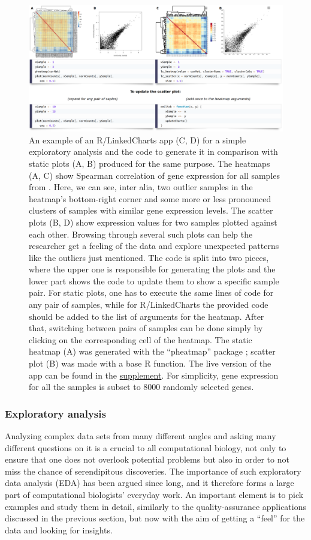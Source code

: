 \documentclass[twocolumn,10pt]{article}
\newcommand{\supplement}{\href{https://anders-biostat.github.io/lc-paper/}{supplement}}
\begin{document}
\begin{figure}[t]
	\includegraphics[width=\textwidth]{FigE/figE.png}
	\caption{An example of an R/LinkedCharts app (C, D) for a simple exploratory analysis and the code to generate it in comparison with static plots (A, B) produced for the same purpose. The heatmaps (A, C) show Spearman correlation of gene expression for all samples from \citet{conway_2015}. Here, we can see, inter alia, two outlier samples in the heatmap's bottom-right corner and some more or less pronounced clusters of samples with similar gene expression levels. The scatter plots (B, D) show expression values for two samples plotted against each other. Browsing through several such plots can help the researcher get a feeling of the data and explore unexpected patterns like the outliers just mentioned. The code is split into two pieces, where the upper one is responsible for generating the plots and the lower part shows the code to update them to show a specific sample pair. For static plots, one has to execute the same lines of code for any pair of samples, while for R/LinkedCharts the provided code should be added to the list of arguments for the heatmap. After that, switching between pairs of samples can be done simply by clicking on the corresponding cell of the heatmap. The static heatmap (A) was generated with the ``pheatmap'' package  \citep{kolde_2019}; scatter plot (B) was made with a base R function. The live version of the app can be found in the \supplement. For simplicity, gene expression for all the samples is subset to 8000 randomly selected genes.}
	\label{FigE}
\end{figure}

\subsubsection{Exploratory analysis}

Analyzing complex data sets from many different angles and asking many different questions on it is a crucial to all computational biology, not only to ensure that one does not overlook potential problems but also in order to not miss the chance of serendipitous discoveries. The importance of such exploratory data analysis (EDA) has been argued since long, and it therefore forms a large part of computational biologists' everyday work. An important element is to pick examples and study them in detail, similarly to the quality-assurance applications discussed in the previous section, but now with the aim of getting a ``feel'' for the data and looking for insights.
\end{document}

